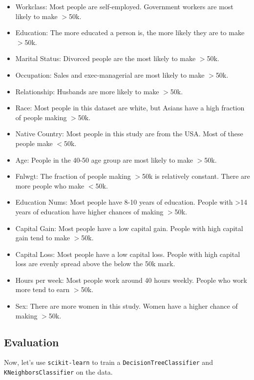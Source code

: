 \begin{enumerate}
\begin{itemize}
  \item Workclass: Most people are self-employed. Government workers are most likely to make $>$50k.
  \item Education: The more educated a person is, the more likely they are to make $>$50k.
  \item Marital Status: Divorced people are the most likely to make $>$50k.
  \item Occupation: Sales and exec-managerial are most likely to make $>$50k.
  \item Relationship: Husbands are more likely to make $>$50k.
  \item Race: Most people in this dataset are white, but Asians have a high fraction of people making $>$50k.
  \item Native Country: Most people in this study are from the USA. Most of these people make $<$50k.
  \item Age: People in the 40-50 age group are most likely to make $>$50k.
  \item Fnlwgt: The fraction of people making $>$50k is relatively constant. There are more people who make $<$50k.
  \item Education Nums: Most people have 8-10 years of education. People with >14 years of education have higher chances of making $>$50k.
  \item Capital Gain: Most people have a low capital gain. People with high capital gain tend to make $>$50k.
  \item Capital Loss: Most people have a low capital loss. People with high capital loss are evenly spread above the below the 50k mark.
  \item Hours per week: Most people work around 40 hours weekly. People who work more tend to earn $>$50k.
  \item Sex: There are more women in this study. Women have a higher chance of making $>$50k.
\end{itemize}

\end{enumerate}

\ifsolution{\newpage}
\subsection{Evaluation }

Now, let's use \verb|scikit-learn| to train a \verb|DecisionTreeClassifier| and \verb|KNeighborsClassifier| on the data.

